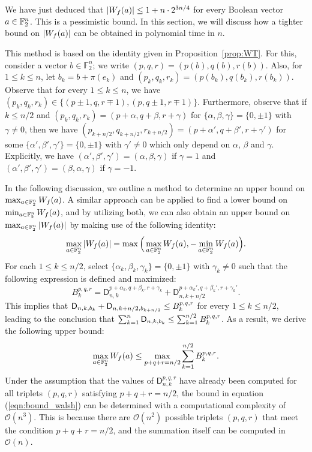 \documentclass[11pt]{llncs}
\begin{document}
We have just deduced that $|W_{f}(a)|\leq 1+n\cdot 2^{3n/4}$ for every Boolean vector $a\in\mathbb{F}_2^n$. This is a pessimistic bound. In this section, we will discuss how a tighter bound on $|W_{f}(a)|$ can be obtained in polynomial time in $n$.

This method is based on the identity given in Proposition~\ref{prop:WT}.
For this, consider a vector $b\in\mathbb F_2^n$; we write $(p,q,r)=(p(b),q(b),r(b))$. Also, for $1\leq k\leq n$, let $b_k=b+\pi(e_k)$ and $(p_k,q_k,r_k)=(p(b_k),q(b_k),r(b_k))$. Observe that for every $1\leq k\leq n$, we have $(p_k,q_k,r_k)\in\{(p\pm1,q,r\mp 1),(p,q\pm 1,r\mp 1)\}$. Furthermore, observe that if $k\leq n/2$ and $(p_k,q_k,r_k)=(p+\alpha,q+\beta,r+\gamma)$ for $\{\alpha,\beta,\gamma\}=\{0,\pm 1\}$ with $\gamma\neq 0$, then we have $(p_{k+n/2},q_{k+n/2},r_{k+n/2})=(p+\alpha',q+\beta',r+\gamma')$ for some $\{\alpha',\beta',\gamma'\}=\{0,\pm 1\}$ with $\gamma'\neq 0$ which only depend on $\alpha$, $\beta$ and $\gamma$. Explicitly, we have $(\alpha',\beta',\gamma')=(\alpha,\beta,\gamma)$ if $\gamma=1$ and $(\alpha',\beta',\gamma')=(\beta,\alpha,\gamma)$ if $\gamma=-1$.

In the following discussion, we outline a method to determine an upper bound on $\max_{a\in\mathbb{F}_2^n}W_{f}(a)$. A similar approach can be applied to find a lower bound on $\min_{a\in\mathbb{F}_2^n}W_{f}(a)$, and by utilizing both, we can also obtain an upper bound on $\max_{a\in\mathbb{F}_2^n}|W_{f}(a)|$ by making use of the following identity:
\[
\max_{a\in\mathbb{F}_2^n}|W_{f}(a)|=\max\Big(\max_{a\in\mathbb{F}_2^n}W_{f}(a),-\min_{a\in\mathbb{F}_2^n}W_{f}(a)\Big).
\]
For each $1\leq k\leq n/2$, select $\{\alpha_k,\beta_k,\gamma_k\}=\{0,\pm 1\}$ with $\gamma_k\neq 0$ such that the following expression is defined and maximized:
\[
B_k^{p,q,r}=\mathsf D_{n,k}^{p+\alpha_k,q+\beta_k,r+\gamma_k}+\mathsf D_{n,k+n/2}^{p+\alpha_k',q+\beta_k',r+\gamma_k'}.
\]
This implies that $\mathsf{D}_{n,k,b_k}+\mathsf{D}_{n,k+n/2,b_{k+n/2}}\leq B_k^{p,q,r}$ for every $1\leq k\leq n/2$, leading to the conclusion that $\sum_{k=1}^n\mathsf{D}_{n,k,b_k}\leq\sum_{k=1}^{n/2} B_k^{p,q,r}$. As a result, we derive the following upper bound:
\begin{equation}\label{eqn:bound_walsh}
\max_{a\in\mathbb{F}_2^n}W_{f}(a)\leq\max_{p+q+r=n/2}\sum_{k=1}^{n/2} B_k^{p,q,r}.
\end{equation}
Under the assumption that the values of $\mathsf{D}_{n,k}^{p,q,r}$ have already been computed for all triplets $(p,q,r)$ satisfying $p+q+r=n/2$, the bound in equation (\ref{eqn:bound_walsh}) can be determined with a computational complexity of $\mathcal{O}(n^3)$. This is because there are $\mathcal{O}(n^2)$ possible triplets $(p,q,r)$ that meet the condition $p+q+r=n/2$, and the summation itself can be computed in $\mathcal{O}(n)$.
\end{document}
